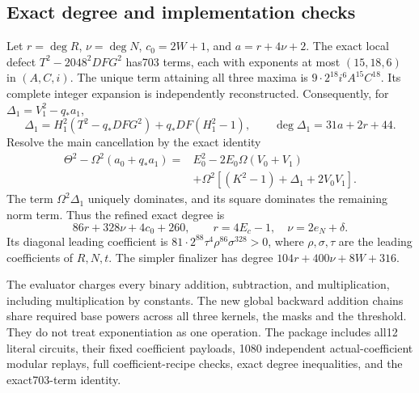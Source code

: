 \subsection{Exact degree and implementation checks}
Let $r=\deg R$, $\nu=\deg N$, $c_0=2W+1$, and $a=r+4\nu+2$.
The exact local defect $T^2-2048^2DFG^2$ has703 terms, each with exponents
at most $(15,18,6)$ in $(A,C,i)$.  The unique term attaining all three
maxima is $9\cdot2^{18}i^6A^{15}C^{18}$.  Its complete integer expansion
is independently reconstructed.  Consequently, for
$\Delta_1=V_1^2-q_*a_1$,
\[
 \Delta_1=H_1^2(T^2-q_*DFG^2)+q_*DF(H_1^2-1),\qquad
 \deg\Delta_1=31a+2r+44.
\]
Resolve the main cancellation by the exact identity
\begin{align*}
 \Theta^2-\Omega^2(a_0+q_*a_1)
 ={}&E_0^2-2E_0\Omega(V_0+V_1)\\
 &+\Omega^2[(K^2-1)+\Delta_1+2V_0V_1].
\end{align*}
The term $\Omega^2\Delta_1$ uniquely dominates, and its square dominates
the remaining norm term.  Thus the refined exact degree is
\[
 \boxed{86r+328\nu+4c_0+260},\qquad
 r=4E_c-1,\quad\nu=2e_N+\delta.
\]
Its diagonal leading coefficient is
$81\cdot2^{88}\tau^4\rho^{86}\sigma^{328}>0$, where
$\rho,\sigma,\tau$ are the leading coefficients of $R,N,t$.
The simpler finalizer has degree $104r+400\nu+8W+316$.

The evaluator charges every binary addition, subtraction, and multiplication,
including multiplication by constants.  The new global backward addition
chains share required base powers across all three kernels, the masks and
the threshold.  They do not treat exponentiation as one operation.
The package includes all12 literal circuits, their fixed coefficient payloads,
1080 independent actual-coefficient modular replays, full coefficient-recipe
checks, exact degree inequalities, and the exact703-term identity.
